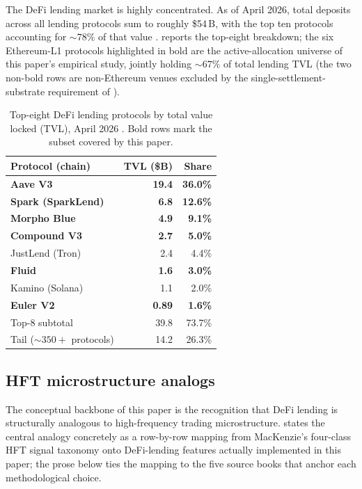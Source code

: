 The DeFi lending market is highly concentrated.  As of April 2026,
total deposits across all lending protocols sum to roughly
\$54\,B, with the top ten protocols accounting for $\sim 78\%$ of
that value \cite{defillama2026snapshot}.  
reports the top-eight breakdown; the six Ethereum-L1 protocols
highlighted in bold are the active-allocation universe of this
paper's empirical study, jointly holding $\sim 67\%$ of total
lending TVL (the two non-bold rows are non-Ethereum venues
excluded by the single-settlement-substrate requirement of
).

\begin{table}[t]
  \centering
  \caption{Top-eight DeFi lending protocols by total value locked
    (TVL), April 2026 \cite{defillama2026snapshot}.  Bold rows mark
    the subset covered by this paper.}
  \label{tab:lending-tvl}
  \begin{tabular}{lrr}
    \toprule
    Protocol (chain)            & TVL (\$B) & Share \\
    \midrule
    \textbf{Aave V3}            & \textbf{19.4} & \textbf{36.0\%} \\
    \textbf{Spark (SparkLend)}  & \textbf{6.8}  & \textbf{12.6\%} \\
    \textbf{Morpho Blue}        & \textbf{4.9}  & \textbf{9.1\%}  \\
    \textbf{Compound V3}        & \textbf{2.7}  & \textbf{5.0\%} \\
    JustLend (Tron)             & 2.4           & 4.4\%  \\
    \textbf{Fluid}              & \textbf{1.6}  & \textbf{3.0\%}  \\
    Kamino (Solana)             & 1.1           & 2.0\%  \\
    \textbf{Euler V2}           & \textbf{0.89} & \textbf{1.6\%}  \\
    \midrule
    Top-8 subtotal              & 39.8          & 73.7\% \\
    Tail ($\sim 350+$ protocols)& 14.2          & 26.3\% \\
    \bottomrule
  \end{tabular}
\end{table}

\subsection{HFT microstructure analogs}
\label{sec:bg-hft}

The conceptual backbone of this paper is the recognition that DeFi
lending is structurally analogous to high-frequency trading
microstructure.   states the central
analogy concretely as a row-by-row mapping from MacKenzie's
four-class HFT signal taxonomy onto DeFi-lending features actually
implemented in this paper; the prose below ties the mapping to
the five source books that anchor each methodological choice.

